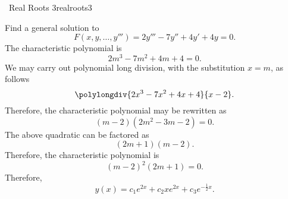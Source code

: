         \pagebreak
        \begin{example}{\Difficulty\,\Difficulty\,\,Real Roots 3}{realroots3}
        
            Find a general solution to
            \begin{equation*}
                F(x,y,\ldots,y''')=2y'''-7y''+4y'+4y=0.
            \end{equation*}
            The characteristic polynomial is
            \begin{equation*}
                2m^3-7m^2+4m+4=0.
            \end{equation*}
            We may carry out polynomial long division, with the substitution \(x=m\), as follows
            \begin{equation*}
                \polylongdiv{2x^3-7x^2+4x+4}{x-2}.
            \end{equation*}
            Therefore, the characteristic polynomial may be rewritten as
            \begin{equation*}
                (m-2)(2m^2-3m-2)=0.
            \end{equation*}
            The above quadratic can be factored as
            \begin{equation*}
                (2m+1)(m-2).
            \end{equation*}
            Therefore, the characteristic polynomial is
            \begin{equation*}
                (m-2)^2(2m+1)=0.
            \end{equation*}
            Therefore,
            \begin{equation*}
                y(x)=c_1e^{2x}+c_2xe^{2x}+c_3e^{-\frac{1}{2}x}.
            \end{equation*}
        
        \end{example}
        \pagebreak

